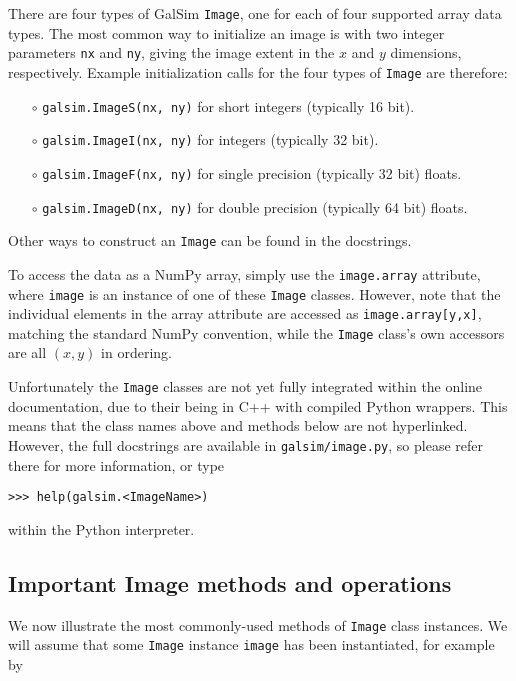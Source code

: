 \documentclass[preprint,11pt]{../../devel/modules/aastex}
\begin{document}
There are four types of GalSim \texttt{Image}, one for each of four
supported array data types.  The most common way to initialize an
image is with two integer parameters \texttt{nx} and \texttt{ny},
giving the image extent in the $x$ and $y$ dimensions, respectively.
Example initialization calls for the four types of \texttt{Image} are
therefore:
\begin{itemize}
\item[$\circ$] \texttt{galsim.ImageS(nx, ny)} {for short integers (typically 16 bit).}

\item[$\circ$] \texttt{galsim.ImageI(nx, ny)} {for integers (typically 32 bit).}

\item[$\circ$] \texttt{galsim.ImageF(nx, ny)} {for single precision (typically 32 bit)
  floats.}

\item[$\circ$] \texttt{galsim.ImageD(nx, ny)} {for double precision (typically 64 bit)
  floats.}

\end{itemize}
Other ways to construct an \texttt{Image} can be found in the docstrings.

To access the data as a NumPy array, simply use the \texttt{image.array}
attribute, where \texttt{image} is an instance of one of these
\texttt{Image} classes.  However, note that the individual elements in
the array attribute are accessed as \texttt{image.array[y,x]}, matching
the standard NumPy convention, while the \texttt{Image} class's own
accessors are all $(x,y)$ in ordering.

Unfortunately the \texttt{Image} classes are not yet fully integrated
within the online documentation, due to their being in C++ with
compiled Python wrappers.  This means that the class names above and
methods below are not hyperlinked.  However, the full docstrings are
available in \texttt{galsim/image.py}, so please refer there for more
information, or type

{\tt >>> help(galsim.<ImageName>)}

within the Python interpreter.

\subsection{Important Image methods and operations}\label{sect:imagemethods}
We now illustrate the most commonly-used methods of \texttt{Image}
class instances.  We will assume that some \texttt{Image} instance
\texttt{image} has been instantiated, for example by
\end{document}

